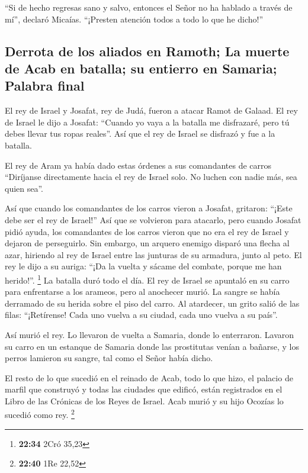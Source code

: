  ``Si de hecho regresas sano y salvo, entonces el Señor
no ha hablado a través de mí'', declaró Micaías. ``¡Presten atención
todos a todo lo que he dicho!''

\hypertarget{derrota-de-los-aliados-en-ramoth-la-muerte-de-acab-en-batalla-su-entierro-en-samaria-palabra-final}{%
\subsection{Derrota de los aliados en Ramoth; La muerte de Acab en
batalla; su entierro en Samaria; Palabra
final}\label{derrota-de-los-aliados-en-ramoth-la-muerte-de-acab-en-batalla-su-entierro-en-samaria-palabra-final}}

 El rey de Israel y Josafat, rey de Judá, fueron a atacar
Ramot de Galaad.  El rey de Israel le dijo a Josafat:
``Cuando yo vaya a la batalla me disfrazaré, pero tú debes llevar tus
ropas reales''. Así que el rey de Israel se disfrazó y fue a la batalla.

 El rey de Aram ya había dado estas órdenes a sus
comandantes de carros ``Diríjanse directamente hacia el rey de Israel
solo. No luchen con nadie más, sea quien sea''.

 Así que cuando los comandantes de los carros vieron a
Josafat, gritaron: ``¡Este debe ser el rey de Israel!'' Así que se
volvieron para atacarlo, pero cuando Josafat pidió ayuda,
 los comandantes de los carros vieron que no era el rey
de Israel y dejaron de perseguirlo.  Sin embargo, un
arquero enemigo disparó una flecha al azar, hiriendo al rey de Israel
entre las junturas de su armadura, junto al peto. El rey le dijo a su
auriga: ``¡Da la vuelta y sácame del combate, porque me han herido!''.
\footnote{\textbf{22:34} 2Cró 35,23}  La batalla duró
todo el día. El rey de Israel se apuntaló en su carro para enfrentarse a
los arameos, pero al anochecer murió. La sangre se había derramado de su
herida sobre el piso del carro.  Al atardecer, un grito
salió de las filas: ``¡Retírense! Cada uno vuelva a su ciudad, cada uno
vuelva a su país''.

 Así murió el rey. Lo llevaron de vuelta a Samaria, donde
lo enterraron.  Lavaron su carro en un estanque de
Samaria donde las prostitutas venían a bañarse, y los perros lamieron su
sangre, tal como el Señor había dicho.

 El resto de lo que sucedió en el reinado de Acab, todo
lo que hizo, el palacio de marfil que construyó y todas las ciudades que
edificó, están registrados en el Libro de las Crónicas de los Reyes de
Israel.  Acab murió y su hijo Ocozías lo sucedió como
rey. \footnote{\textbf{22:40} 1Re 22,52}

